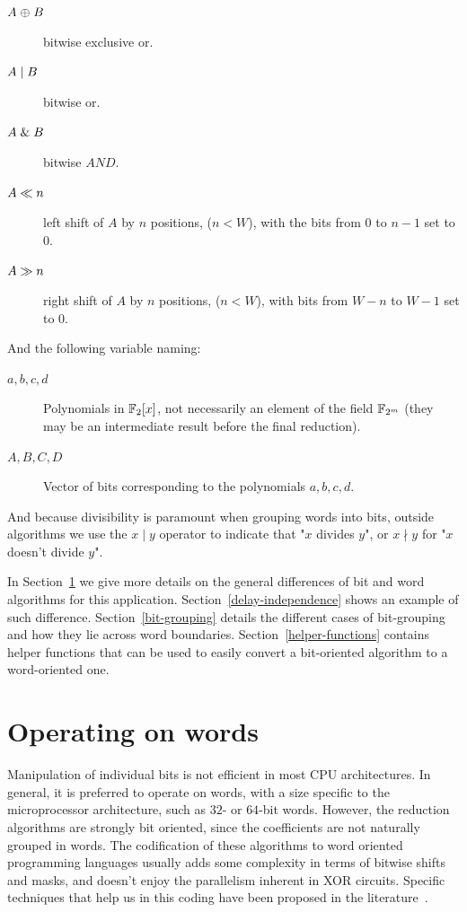 \begin{description}
\item[$A \mathrel{\oplus} B$] bitwise exclusive or.
\item[$A \mathrel{|} B$]  bitwise or. 
\item[$A \mathrel{\&} B$]      bitwise $AND$.
\item[$A \ll n$]      left shift of $A$ by $n$ positions, ($n<W$), with the bits from 0 to $n-1$ set to $0$. 
\item[$A\gg n$]     right shift of $A$ by $n$ positions, ($n<W$), with bits from $W-n$ to $W-1$ set to $0$. 
\end{description}

And the following variable naming:

\begin{description}
\item[$a, b, c, d$]  Polynomials in $\mathbb{F}_2[x]$, not necessarily an element of the field $\mathbb{F}_{2^m}$ (they may be an intermediate result before the final reduction).
\item[$A, B, C, D$]  Vector of bits corresponding to the polynomials $a, b, c, d$.
\end{description}

And because divisibility is paramount when grouping words into bits, outside algorithms we use the $x \mid y$ operator to indicate that "$x$ divides $y$", or $x \nmid y$ for "$x$ doesn't divide $y$".

In Section~\ref{operating-on-words} we give more details on the general differences of bit and word algorithms for this application. Section~\ref{delay-independence} shows an example of such difference. Section~\ref{bit-grouping} details the different cases of bit-grouping and how they lie across word boundaries. Section~\ref{helper-functions} contains helper functions that can be used to easily convert a bit-oriented algorithm to a word-oriented one.

\section{Operating on words}\label{operating-on-words}

Manipulation of individual bits is not efficient in most CPU architectures. In general, it is preferred to operate on words, with a size specific to the microprocessor architecture, such as $32$- or $64$-bit words. However, the reduction algorithms are strongly bit oriented, since the coefficients are not naturally grouped in words. The codification of these algorithms to word oriented programming languages usually adds some complexity in terms of bitwise shifts and masks, and doesn't enjoy the parallelism inherent in XOR circuits. Specific techniques that help us in this coding have been proposed in the literature~\cite{hilewitz2008advanced}.  \\

